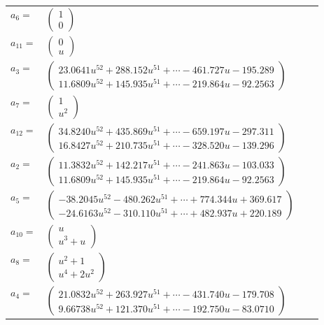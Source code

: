\documentclass[1p]{elsarticle_modified}
\theoremstyle{definition}
\begin{document}
\begin{tabular}{m{7pt} m{180pt} m{7pt} m{180pt} }
\flushright $a_{6}=$&$\begin{pmatrix}1\\0\end{pmatrix}$ \\
\flushright $a_{11}=$&$\begin{pmatrix}0\\u\end{pmatrix}$ \\
\flushright $a_{3}=$&$\begin{pmatrix}23.0641 u^{52}+288.152 u^{51}+\cdots-461.727 u-195.289\\11.6809 u^{52}+145.935 u^{51}+\cdots-219.864 u-92.2563\end{pmatrix}$ \\
\flushright $a_{7}=$&$\begin{pmatrix}1\\u^2\end{pmatrix}$ \\
\flushright $a_{12}=$&$\begin{pmatrix}34.8240 u^{52}+435.869 u^{51}+\cdots-659.197 u-297.311\\16.8427 u^{52}+210.735 u^{51}+\cdots-328.520 u-139.296\end{pmatrix}$ \\
\flushright $a_{2}=$&$\begin{pmatrix}11.3832 u^{52}+142.217 u^{51}+\cdots-241.863 u-103.033\\11.6809 u^{52}+145.935 u^{51}+\cdots-219.864 u-92.2563\end{pmatrix}$ \\
\flushright $a_{5}=$&$\begin{pmatrix}-38.2045 u^{52}-480.262 u^{51}+\cdots+774.344 u+369.617\\-24.6163 u^{52}-310.110 u^{51}+\cdots+482.937 u+220.189\end{pmatrix}$ \\
\flushright $a_{10}=$&$\begin{pmatrix}u\\u^3+u\end{pmatrix}$ \\
\flushright $a_{8}=$&$\begin{pmatrix}u^2+1\\u^4+2 u^2\end{pmatrix}$ \\
\flushright $a_{4}=$&$\begin{pmatrix}21.0832 u^{52}+263.927 u^{51}+\cdots-431.740 u-179.708\\9.66738 u^{52}+121.370 u^{51}+\cdots-192.750 u-83.0710\end{pmatrix}$ \\

\end{tabular}
\end{document}
